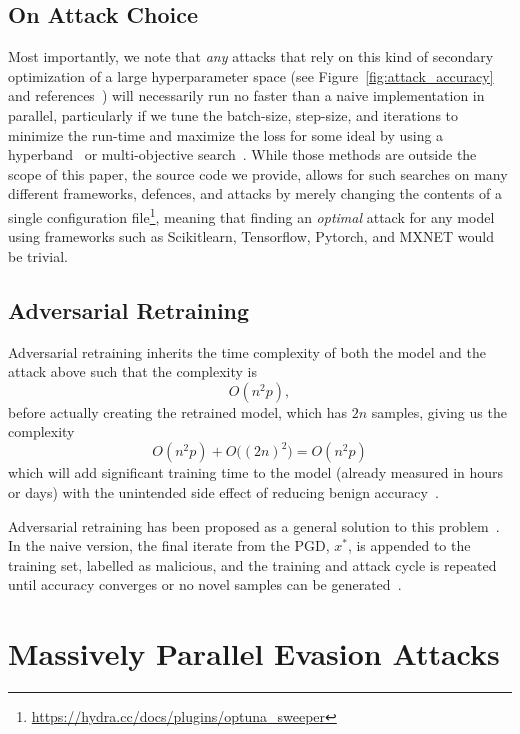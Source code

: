 \documentclass[fonts]{icst}
\begin{document}
\subsection{On Attack Choice}

Most importantly, we note that \textit{any} attacks that rely on this kind of secondary optimization of a large hyperparameter space (see Figure~\ref{fig:attack_accuracy} and references~\cite{su2019one,carlini2017towards,chen2020hopskipjumpattack,brown2017adversarial,brendel2017decision,croce2020reliable,liu2018dpatch,qin2019imperceptible,grosse2018limitations,kotyan2019adversarial,chen2017zoo}) will necessarily run no faster than a naive implementation in parallel, particularly if we tune the batch-size, step-size, and iterations to minimize the run-time and maximize the loss for some ideal by using a hyperband~\cite{li2017hyperband} or multi-objective search~\cite{hansen2016cma,ozaki2022multiobjective}.
While those methods are outside the scope of this paper, the source code we provide, allows for such searches on many different frameworks, defences, and attacks by merely changing the contents of a single configuration file\footnote{\href{https://hydra.cc/docs/plugins/optuna_sweeper/}{https://hydra.cc/docs/plugins/optuna\_sweeper}}, meaning that finding an \textit{optimal} attack for any model using frameworks such as Scikitlearn, Tensorflow, Pytorch, and MXNET would be trivial.

\subsection{Adversarial Retraining}
\label{retrain}
Adversarial retraining inherits the time complexity of both the model and the attack above such that the complexity is
$$
    O(n^2p),
$$
before actually creating the retrained model, which has $2n$ samples, giving us the complexity
$$
    O(n^2p) + O\big({(2n)}^2\big) = O(n^2p)
$$
which will add significant training time to the model (already measured in hours or days) with the unintended side effect of reducing benign accuracy~\cite{stutz2019confidence}.

Adversarial retraining has been proposed as a general solution to this problem~\cite{li2016general,stutz2019confidence}.
In the naive version, the final iterate from the PGD, $x^{*}$, is appended to the training set, labelled as malicious, and the training and attack cycle is repeated until accuracy converges or no novel samples can be generated~\cite{li2016general}.

\section{Massively Parallel Evasion Attacks}
\end{document}
